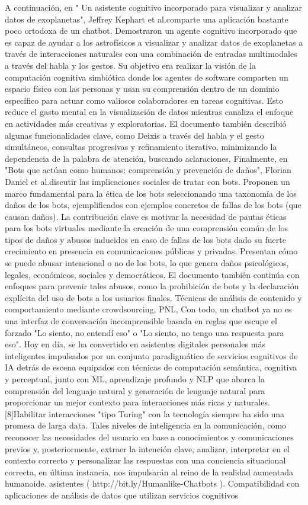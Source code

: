 A continuación, en " Un asistente cognitivo incorporado para visualizar y analizar datos de exoplanetas", Jeffrey Kephart et al.comparte una aplicación bastante poco ortodoxa de un chatbot. Demostraron un agente cognitivo incorporado que es capaz de ayudar a los astrofísicos a visualizar y analizar datos de exoplanetas a través de interacciones naturales con una combinación de entradas multimodales a través del habla y los gestos. Su objetivo era realizar la visión de la computación cognitiva simbiótica donde los agentes de software comparten un espacio físico con las personas y usan su comprensión dentro de un dominio específico para actuar como valiosos colaboradores en tareas cognitivas. Esto reduce el gasto mental en la visualización de datos mientras canaliza el enfoque en actividades más creativas y exploratorias. El documento también describió algunas funcionalidades clave, como Deixis a través del habla y el gesto simultáneos, consultas progresivas y refinamiento iterativo, minimizando la dependencia de la palabra de atención, buscando aclaraciones,
Finalmente, en "Bots que actúan como humanos: comprensión y prevención de daños", Florian Daniel et al.discutir las implicaciones sociales de tratar con bots. Proponen un marco fundamental para la ética de los bots seleccionando una taxonomía de los daños de los bots, ejemplificados con ejemplos concretos de fallas de los bots (que causan daños). La contribución clave es motivar la necesidad de pautas éticas para los bots virtuales mediante la creación de una comprensión común de los tipos de daños y abusos inducidos en caso de fallas de los bots dado su fuerte crecimiento en presencia en comunicaciones públicas y privadas. Presentan cómo se puede abusar intencional o no de los bots, lo que genera daños psicológicos, legales, económicos, sociales y democráticos. El documento también continúa con enfoques para prevenir tales abusos, como la prohibición de bots y la declaración explícita del uso de bots a los usuarios finales. Técnicas de análisis de contenido y comportamiento mediante crowdsourcing, PNL,
Con todo, un chatbot ya no es una interfaz de conversación incomprensible basada en reglas que escupe el forzado "Lo siento, no entendí eso" o "Lo siento, no tengo una respuesta para eso". Hoy en día, se ha convertido en asistentes digitales personales más inteligentes impulsados ​​por un conjunto paradigmático de servicios cognitivos de IA detrás de escena equipados con técnicas de computación semántica, cognitiva y perceptual, junto con ML, aprendizaje profundo y NLP que abarca la comprensión del lenguaje natural y generación de lenguaje natural para proporcionar un mejor contexto para interacciones más ricas y naturales. [8]Habilitar interacciones "tipo Turing" con la tecnología siempre ha sido una promesa de larga data. Tales niveles de inteligencia en la comunicación, como reconocer las necesidades del usuario en base a conocimientos y comunicaciones previos y, posteriormente, extraer la intención clave, analizar, interpretar en el contexto correcto y personalizar las respuestas con una conciencia situacional correcta, en última instancia, nos impulsarán al reino de la realidad aumentada humanoide. asistentes ( http://bit.ly/Humanlike-Chatbots ).
Compatibilidad con aplicaciones de análisis de datos que utilizan servicios cognitivos
 

